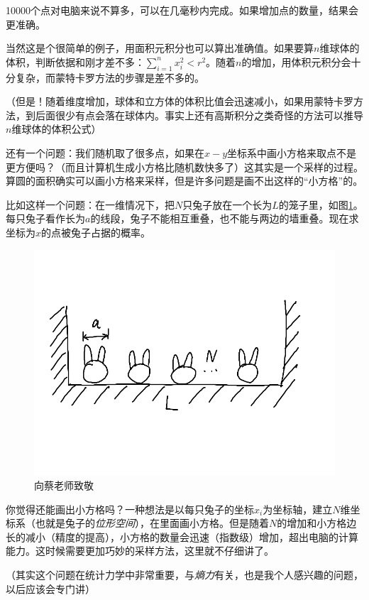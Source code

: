 10000个点对电脑来说不算多，可以在几毫秒内完成。如果增加点的数量，结果会更准确。

当然这是个很简单的例子，用面积元积分也可以算出准确值。如果要算$n$维球体的体积，判断依据和刚才差不多：$\sum_{i=1}^n x_i^2<r^2$。随着$n$的增加，用体积元积分会十分复杂，而蒙特卡罗方法的步骤是差不多的。

（但是！随着维度增加，球体和立方体的体积比值会迅速减小，如果用蒙特卡罗方法，到后面很少有点会落在球体内。事实上还有高斯积分之类奇怪的方法可以推导$n$维球体的体积公式）

还有一个问题：我们随机取了很多点，如果在$x-y$坐标系中画小方格来取点不是更方便吗？（而且计算机生成小方格比随机数快多了）这其实是一个采样的过程。算圆的面积确实可以画小方格来采样，但是许多问题是画不出这样的“小方格”的。

比如这样一个问题：在一维情况下，把$N$只兔子放在一个长为$L$的笼子里，如图\ref{fig-rabbit-box}。每只兔子看作长为$a$的线段，兔子不能相互重叠，也不能与两边的墙重叠。现在求坐标为$x$的点被兔子占据的概率。
\begin{figure}[htb]
\centering
\includegraphics[scale=0.5]{fig/rabbit-box}
\caption{向蔡老师致敬}
\label{fig-rabbit-box}
\end{figure}

你觉得还能画出小方格吗？一种想法是以每只兔子的坐标$x_i$为坐标轴，建立$N$维坐标系（也就是兔子的\emph{位形空间}），在里面画小方格。但是随着$N$的增加和小方格边长的减小（精度的提高），小方格的数量会迅速（指数级）增加，超出电脑的计算能力。这时候需要更加巧妙的采样方法，这里就不仔细讲了。

（其实这个问题在统计力学中非常重要，与\emph{熵力}有关，也是我个人感兴趣的问题，以后应该会专门讲）

